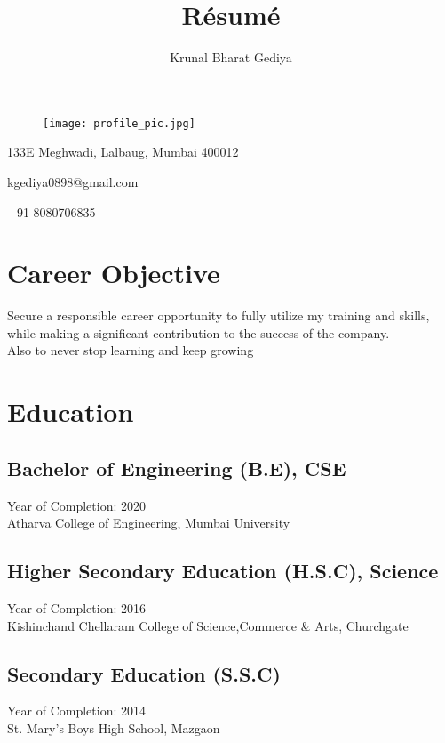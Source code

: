 \documentclass[11pt]{article}
\begin{document}
\title{R\'esum\'e}

\author{Krunal Bharat Gediya}

\maketitle
\begin{figure}[H]
    \centering
    \texttt{[image: profile\_pic.jpg]}
\end{figure}
\begin{center}
    133E Meghwadi, Lalbaug, Mumbai 400012

    kgediya0898@gmail.com
    
    +91 8080706835 
\end{center}

\section{Career Objective}
Secure a responsible career opportunity to fully utilize my training and skills, while making a significant contribution to the success of the company.\\
Also to never stop learning and keep growing
\section{Education}
\subsection{Bachelor of Engineering (B.E), CSE}
Year of Completion: 2020\\
Atharva College of Engineering, Mumbai University
\subsection{Higher Secondary Education (H.S.C), Science}
Year of Completion: 2016\\
Kishinchand Chellaram College of Science,Commerce \& Arts, Churchgate
\subsection{Secondary Education (S.S.C)}
Year of Completion: 2014\\
St. Mary's Boys High School, Mazgaon
\end{document}
